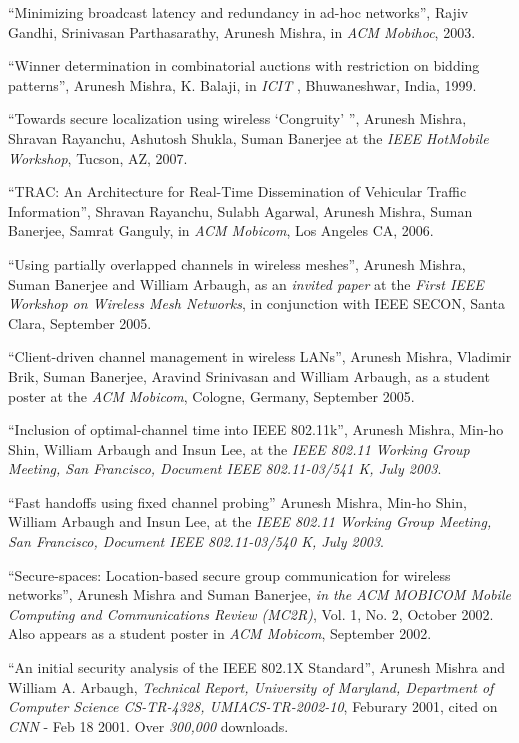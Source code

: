 \begin{resume}
\mybullet ``Minimizing broadcast latency and redundancy in ad-hoc networks'', Rajiv Gandhi, Srinivasan Parthasarathy, 
Arunesh Mishra, in {\em ACM Mobihoc}, 2003.

\mybullet ``Winner determination in combinatorial auctions with restriction on bidding patterns'', Arunesh Mishra, 
K. Balaji, in {\em ICIT }, Bhuwaneshwar, India, 1999.

\vspace{-0.7cm}

\mybullet ``Towards secure localization using wireless `Congruity' '', Arunesh Mishra, Shravan Rayanchu, Ashutosh Shukla, Suman Banerjee
at the {\it IEEE HotMobile Workshop}, Tucson, AZ, 2007.

\mybullet ``TRAC: An Architecture for Real-Time Dissemination of Vehicular Traffic Information'',
Shravan Rayanchu, Sulabh Agarwal, Arunesh Mishra, Suman Banerjee, Samrat Ganguly,  in {\it ACM Mobicom}, Los Angeles CA, 2006.

\mybullet ``Using partially overlapped channels in wireless meshes'', Arunesh Mishra, Suman Banerjee and William Arbaugh,
as an {\em invited paper} at the {\em First IEEE Workshop on Wireless Mesh Networks}, in conjunction with IEEE SECON,
Santa Clara, September 2005.

\mybullet ``Client-driven channel management in wireless LANs'', Arunesh Mishra, Vladimir Brik, Suman Banerjee, Aravind Srinivasan
and William Arbaugh, as a student poster at  the {\em ACM Mobicom}, Cologne, Germany, September 2005.

\mybullet ``Inclusion of optimal-channel time into IEEE 802.11k'', Arunesh Mishra,  Min-ho Shin, William Arbaugh and Insun Lee,
at the {\em IEEE 802.11 Working Group Meeting, San Francisco, Document IEEE 802.11-03/541 K, July 2003}.

\mybullet ``Fast handoffs using fixed channel probing'' Arunesh Mishra, Min-ho Shin, William Arbaugh and Insun Lee, at the 
{\em IEEE 802.11 Working Group Meeting, San Francisco, Document IEEE 802.11-03/540 K, July 2003}.

\mybullet ``Secure-spaces: Location-based secure group communication for wireless networks'', Arunesh Mishra and 
Suman Banerjee, {\em in the ACM MOBICOM Mobile Computing and Communications Review (MC2R)}, Vol. 1, No. 2, October 2002.
Also appears as a student poster in {\em ACM Mobicom}, September 2002.


\mybullet ``An initial security analysis of the IEEE 802.1X Standard'', Arunesh Mishra and William A. Arbaugh,
{\em Technical Report, University of Maryland, Department of Computer Science CS-TR-4328, 
UMIACS-TR-2002-10}, Feburary 2001, cited on {\em CNN} - Feb 18 2001. Over {\em 300,000} downloads.



\end{resume}
